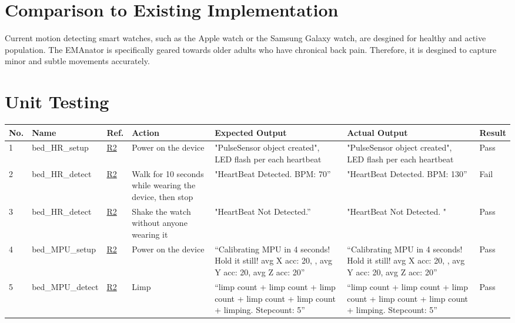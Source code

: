 \documentclass[12pt, titlepage]{article}
\begin{document}
\section{Comparison to Existing Implementation}
Current motion detecting smart watches, such as the Apple watch or the Samsung Galaxy watch, are desgined for healthy and active population. The EMAnator is specifically geared towards older adults who have chronical back pain. Therefore, it is desgined to capture minor and subtle movements accurately.

\section{Unit Testing}\label{unit}

\begin{center}
\begin{table} [H]
\begin{tabular}{ | p{0.5cm} | p{2.8cm} |  p{1.1cm} | p{2.7cm} | p{2.7cm} | p{2.7cm} | p{1.1cm} |}
\hline
\textbf{No.} & \textbf{Name}  & \textbf{Ref.} & \textbf{Action} & \textbf{Expected Output} & \textbf{Actual \newline Output} & \textbf{Result} \\
\hline
1 & bed\_HR\_setup & \href{https://github.com/zakerl/Capstone_Project/blob/main/docs/SRS/SRS.pdf}{R2} & Power on the device & "PulseSensor object created", LED flash per each heartbeat & "PulseSensor object created", LED flash per each heartbeat & Pass \\ 
\hline
2 & bed\_HR\_detect & \href{https://github.com/zakerl/Capstone_Project/blob/main/docs/SRS/SRS.pdf}{R2} & Walk for 10 seconds while wearing the device, then stop & "HeartBeat Detected. BPM: 70” & "HeartBeat Detected. BPM: 130” & Fail \\  
\hline
3 & bed\_HR\_detect & \href{https://github.com/zakerl/Capstone_Project/blob/main/docs/SRS/SRS.pdf}{R2} & Shake the watch without anyone wearing it & "HeartBeat Not Detected.” & "HeartBeat Not Detected. " & Pass \\  
\hline
4 & bed\_MPU\newline \_setup & \href{https://github.com/zakerl/Capstone_Project/blob/main/docs/SRS/SRS.pdf}{R2} & Power on the device & “Calibrating MPU in 4 seconds! Hold it still! avg X acc: 20, , avg Y acc: 20, avg Z acc: 20” & “Calibrating MPU in 4 seconds! Hold it still! avg X acc: 20, , avg Y acc: 20, avg Z acc: 20” & Pass \\  
\hline
5 & bed\_MPU\newline \_detect & \href{https://github.com/zakerl/Capstone_Project/blob/main/docs/SRS/SRS.pdf}{R2} & Limp & “limp count + limp count + limp count + limp count + limp count + limping. Stepcount: 5” & “limp count + limp count + limp count + limp count + limp count + limping. Stepcount: 5” & Pass \\ 

\end{tabular}
\end{table}
\end{center}
\end{document}
